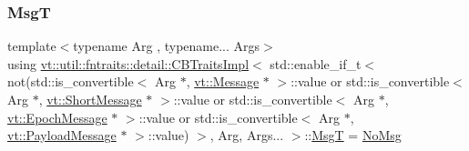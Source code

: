 \subsubsection{\texorpdfstring{MsgT}{MsgT}}
{\footnotesize\ttfamily template$<$typename Arg , typename... Args$>$ \\
using \hyperlink{structvt_1_1util_1_1fntraits_1_1detail_1_1_c_b_traits_impl}{vt\+::util\+::fntraits\+::detail\+::\+C\+B\+Traits\+Impl}$<$ std\+::enable\+\_\+if\+\_\+t$<$ not(std\+::is\+\_\+convertible$<$ Arg $\ast$, \hyperlink{namespacevt_a3a3ddfef40b4c90915fa43cdd5f129ea}{vt\+::\+Message} $\ast$ $>$\+::value or std\+::is\+\_\+convertible$<$ Arg $\ast$, \hyperlink{namespacevt_a1125ac1da6c0bbf141e0ea0739d7602d}{vt\+::\+Short\+Message} $\ast$ $>$\+::value or std\+::is\+\_\+convertible$<$ Arg $\ast$, \hyperlink{namespacevt_ad67368ffae52d7325002586b41bb150e}{vt\+::\+Epoch\+Message} $\ast$ $>$\+::value or std\+::is\+\_\+convertible$<$ Arg $\ast$, \hyperlink{namespacevt_a89a92229c5622b855c02c549f83a1a68}{vt\+::\+Payload\+Message} $\ast$ $>$\+::value) $>$, Arg, Args... $>$\+::\hyperlink{structvt_1_1util_1_1fntraits_1_1detail_1_1_c_b_traits_impl_3_01std_1_1enable__if__t_3_01not_07st51a32586efc3bbebdea14e54779d89f5_a11c6e1b0c3ef3b5dcde9611fd16af4c6}{MsgT} =  \hyperlink{structvt_1_1util_1_1fntraits_1_1detail_1_1_no_msg}{No\+Msg}}

